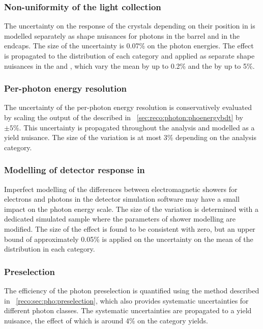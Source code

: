 \subsubsection{Non-uniformity of the light collection}
The uncertainty on the response of the \ECAL crystals depending on their position in \eta is modelled separately as shape nuisances for photons in the barrel and in the endcaps. The size of the uncertainty is 0.07\% on the photon energies. The effect is propagated to the \mgg distribution of each category and applied as separate shape nuisances in the \EE and \EB, which vary the mean by up to 0.2\% and the \effSigma by up to 5\%.

\subsubsection{Per-photon energy resolution}
The uncertainty of the per-photon energy resolution is conservatively evaluated by scaling the output of the \PhoEnergyBdt described in \Sec~\ref{sec:reco:photon:phoenergybdt} by $\pm5\%$. This uncertainty is propagated throughout the analysis and modelled as a yield nuisance. The size of the variation is at most 3\% depending on the analysis category.


\subsubsection{Modelling of detector response in \Geant}
Imperfect modelling of the differences between electromagnetic showers for electrons and photons in the detector simulation software \Geant may have a small impact on the photon energy scale. The size of the variation is determined with a dedicated simulated sample where the parameters of shower modelling are modified. The size of the effect is found to be consistent with zero, but an upper bound of approximately 0.05\% is applied on the uncertainty on the mean of the \mgg distribution in each category.

\subsubsection{Preselection}
The efficiency of the photon preselection is quantified using the \TagAndProbe method described in \Sec~\ref{reco:sec:pho:preselection}, which also provides systematic uncertainties for different photon classes. The systematic uncertainties are propagated to a yield nuisance,
the effect of which is around 4\% on the category yields.

